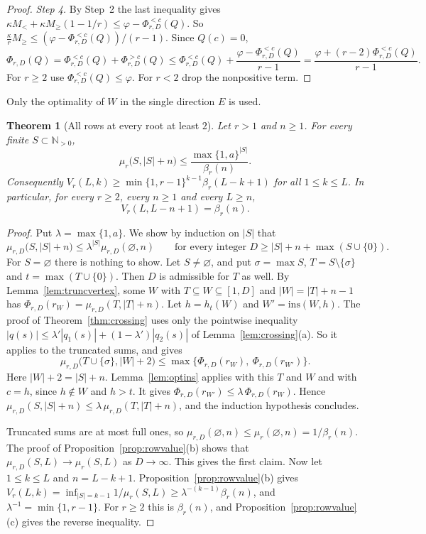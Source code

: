 \documentclass[11pt]{article}
\newtheorem{theorem}{Theorem}[section]
\newcommand{\N}{\mathbb N}
\begin{document}
\begin{proof}
\emph{Step 4.}  By Step~2 the last inequality gives
$\kappa M_<+\kappa M_\ge(1-1/r)\le\varphi-\Phi_{r,D}^{<c}(Q)$.  So
$\frac\kappa rM_\ge\le(\varphi-\Phi_{r,D}^{<c}(Q))/(r-1)$.  Since $Q(c)=0$,
\[
  \Phi_{r,D}(Q)=\Phi_{r,D}^{<c}(Q)+\Phi_{r,D}^{>c}(Q)
  \le\Phi_{r,D}^{<c}(Q)+\frac{\varphi-\Phi_{r,D}^{<c}(Q)}{r-1}
  =\frac{\varphi+(r-2)\Phi_{r,D}^{<c}(Q)}{r-1}.
\]
For $r\ge2$ use $\Phi_{r,D}^{<c}(Q)\le\varphi$.  For $r<2$ drop the
nonpositive term.
\end{proof}

Only the optimality of $W$ in the single direction $E$ is used.

\begin{theorem}[All rows at every root at least $2$]\label{thm:allrowstwo}
Let $r>1$ and $n\ge1$.  For every finite $S\subset\N_{>0}$,
\[
  \mu_r\bigl(S,|S|+n\bigr)\le\frac{\max\{1,a\}^{|S|}}{\beta_r(n)} .
\]
Consequently $V_r(L,k)\ge\min\{1,r-1\}^{k-1}\beta_r(L-k+1)$ for all
$1\le k\le L$.  In particular, for every $r\ge2$, every $n\ge1$ and every
$L\ge n$,
\[
  V_r(L,L-n+1)=\beta_r(n).
\]
\end{theorem}

\begin{proof}
Put $\lambda=\max\{1,a\}$.  We show by induction on $|S|$ that
\[
  \mu_{r,D}\bigl(S,|S|+n\bigr)\le\lambda^{|S|}\mu_{r,D}(\varnothing,n)
  \qquad\text{for every integer }D\ge|S|+n+\max(S\cup\{0\}).
\]
For $S=\varnothing$ there is nothing to show.  Let $S\ne\varnothing$, and put
$\sigma=\max S$, $T=S\setminus\{\sigma\}$ and $t=\max(T\cup\{0\})$.  Then $D$
is admissible for $T$ as well.  By Lemma~\ref{lem:truncvertex}, some $W$ with
$T\subseteq W\subseteq[1,D]$ and $|W|=|T|+n-1$ has
$\Phi_{r,D}(r_W)=\mu_{r,D}(T,|T|+n)$.  Let $h=h_t(W)$ and
$W'=\mathrm{ins}(W,h)$.  The proof of Theorem~\ref{thm:crossing} uses only
the pointwise inequality $|q(s)|\le\lambda'|q_1(s)|+(1-\lambda')|q_2(s)|$ of
Lemma~\ref{lem:crossing}(a).  So it applies to the truncated sums, and gives
\[
  \mu_{r,D}\bigl(T\cup\{\sigma\},|W|+2\bigr)\le
  \max\bigl\{\Phi_{r,D}(r_W),\ \Phi_{r,D}(r_{W'})\bigr\}.
\]
Here $|W|+2=|S|+n$.  Lemma~\ref{lem:optins} applies with this $T$ and $W$
and with $c=h$, since $h\notin W$ and $h>t$.  It gives
$\Phi_{r,D}(r_{W'})\le\lambda\,\Phi_{r,D}(r_W)$.  Hence
$\mu_{r,D}(S,|S|+n)\le\lambda\,\mu_{r,D}(T,|T|+n)$, and the induction
hypothesis concludes.

Truncated sums are at most full ones, so
$\mu_{r,D}(\varnothing,n)\le\mu_r(\varnothing,n)=1/\beta_r(n)$.  The proof of
Proposition~\ref{prop:rowvalue}(b) shows that $\mu_{r,D}(S,L)\to\mu_r(S,L)$
as $D\to\infty$.  This gives the first claim.  Now let $1\le k\le L$ and
$n=L-k+1$.  Proposition~\ref{prop:rowvalue}(b) gives
$V_r(L,k)=\inf_{|S|=k-1}1/\mu_r(S,L)\ge\lambda^{-(k-1)}\beta_r(n)$, and
$\lambda^{-1}=\min\{1,r-1\}$.  For $r\ge2$ this is $\beta_r(n)$, and
Proposition~\ref{prop:rowvalue}(c) gives the reverse inequality.
\end{proof}
\end{document}
